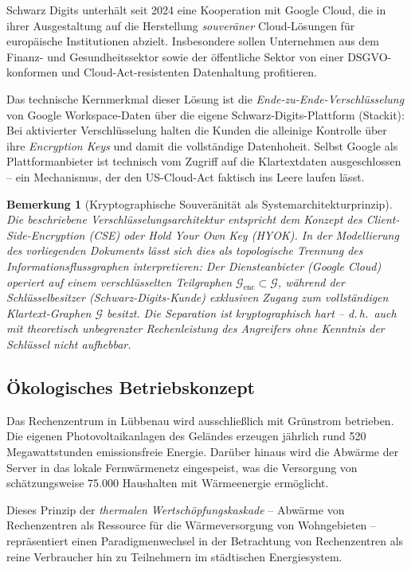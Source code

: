 ﻿\documentclass[12pt, a4paper, openany]{report}
\newtheorem{remark}[theorem]{Bemerkung}
\newcommand{\calG}{\mathcal{G}}
\begin{document}
Schwarz Digits unterhält seit 2024 eine Kooperation mit Google Cloud, die
in ihrer Ausgestaltung auf die Herstellung \emph{souveräner} Cloud-Lösungen
für europäische Institutionen abzielt. Insbesondere sollen Unternehmen
aus dem Finanz- und Gesundheitssektor sowie der öffentliche Sektor
von einer DSGVO-konformen und Cloud-Act-resistenten Datenhaltung profitieren.

Das technische Kernmerkmal dieser Lösung ist die \emph{Ende-zu-Ende-Verschlüsselung}
von Google Workspace-Daten über die eigene Schwarz-Digits-Plattform (Stackit):
Bei aktivierter Verschlüsselung halten die Kunden die alleinige Kontrolle
über ihre \textit{Encryption Keys} und damit die vollständige Datenhoheit.
Selbst Google als Plattformanbieter ist technisch vom Zugriff auf die
Klartextdaten ausgeschlossen -- ein Mechanismus, der den US-Cloud-Act
faktisch ins Leere laufen lässt.

\begin{remark}[Kryptographische Souveränität als Systemarchitekturprinzip]
	\label{rem:crypto_sovereignty}
	Die beschriebene Verschlüsselungsarchitektur entspricht dem Konzept des
	\emph{Client-Side-Encryption} (CSE) oder \emph{Hold Your Own Key} (HYOK).
	In der Modellierung des vorliegenden Dokuments lässt sich dies als
	topologische Trennung des Informationsflussgraphen interpretieren: Der
	Diensteanbieter (Google Cloud) operiert auf einem verschlüsselten
	Teilgraphen $\calG_{\text{enc}} \subset \calG$, während der
	Schlüsselbesitzer (Schwarz-Digits-Kunde) exklusiven Zugang zum
	vollständigen Klartext-Graphen $\calG$ besitzt. Die Separation ist
	kryptographisch hart -- d.\,h.\ auch mit theoretisch unbegrenzter
	Rechenleistung des Angreifers ohne Kenntnis der Schlüssel nicht aufhebbar.
\end{remark}

\subsection{Ökologisches Betriebskonzept}

Das Rechenzentrum in Lübbenau wird ausschließlich mit Grünstrom betrieben.
Die eigenen Photovoltaikanlagen des Geländes erzeugen jährlich rund
520 Megawattstunden emissionsfreie Energie. Darüber hinaus wird die Abwärme
der Server in das lokale Fernwärmenetz eingespeist, was die Versorgung von
schätzungsweise 75.000 Haushalten mit Wärmeenergie ermöglicht.

Dieses Prinzip der \emph{thermalen Wertschöpfungskaskade} -- Abwärme von
Rechenzentren als Ressource für die Wärmeversorgung von Wohngebieten --
repräsentiert einen Paradigmenwechsel in der Betrachtung von Rechenzentren
als reine Verbraucher hin zu Teilnehmern im städtischen Energiesystem.
\end{document}
